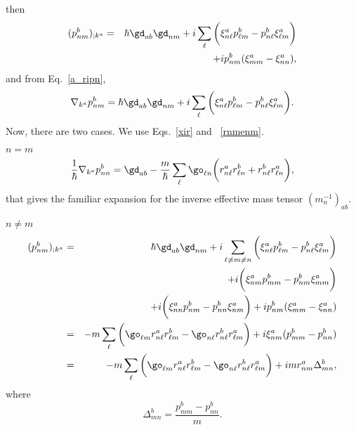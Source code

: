 then
\begin{eqnarray}\label{a_rapb2}
(p^b_{nm})_{;k^a}&=&
\hbar\gd_{ab}\gd_{nm}
+i
\sum_{\ell}
\bigg(
\xi^a_{n\ell}
p^b_{\ell m}
-
p^b_{n\ell}
\xi^a_{\ell m}
\bigg)
\nonumber \\
&&+i
p^b_{nm}(\xi^a_{mm}
-
\xi^a_{nn}
)
,
\end{eqnarray}
and from Eq.~\eqref{a_ripn},
\begin{eqnarray}\label{cogno}
\nabla_{k^a}p^b_{nm}=
\hbar\gd_{ab}\gd_{nm}
+i
\sum_{\ell}
\bigg(
\xi^a_{n\ell}
p^b_{\ell m}
-
p^b_{n\ell}
\xi^a_{\ell m}
\bigg)
.
\end{eqnarray}
Now, there are two cases. We use Eqs.~\eqref{xir} and ~\eqref{rnmenm}.

 $n=m$
\begin{eqnarray}\label{tita}
\frac{1}{\hbar}\nabla_{k^a}p^b_{nn}=
\gd_{ab}
-\frac{m}{\hbar}
\sum_{\ell}
\go_{\ell n}
\bigg(
r^a_{n\ell}
r^b_{\ell n}
+
r^b_{n\ell}
r^a_{\ell n}
\bigg)
,
\end{eqnarray}
that gives the familiar expansion for the inverse effective mass
tensor $(m_n^{-1})_{ab}$.\cite{aschcroft}

 $n\ne m$
\begin{eqnarray}\label{mes}
(p^b_{nm})_{;k^a}&=&
\hbar\gd_{ab}\gd_{nm}
+i
\sum_{\ell\ne m\ne n}
\bigg(
\xi^a_{n\ell}
p^b_{\ell m}
-
p^b_{n\ell}
\xi^a_{\ell m}
\bigg)
\nonumber\\
&&+
i
\bigg(
\xi^a_{nm}
p^b_{mm}
-
p^b_{nm}
\xi^a_{mm}
\bigg)
\nonumber\\
&&+
i
\bigg(
\xi^a_{nn}
p^b_{nm}
-
p^b_{nn}
\xi^a_{nm}
\bigg)
+i
p^b_{nm}(\xi^a_{mm}
-
\xi^a_{nn}
)
\nonumber \\
&=&
-m
\sum_{\ell}
\bigg(
\go_{\ell m}
r^a_{n\ell}
r^b_{\ell m}
-
\go_{n\ell}
r^b_{n\ell}
r^a_{\ell m}
\bigg)
+i
\xi^a_{nm}
(p^b_{mm}
-
p^b_{nn}
)
\nonumber \\
&=&
-m
\sum_{\ell}
\bigg(
\go_{\ell m}
r^a_{n\ell}
r^b_{\ell m}
-
\go_{n\ell}
r^b_{n\ell}
r^a_{\ell m}
\bigg)
+i
mr^a_{nm}
\Delta^b_{mn}
,
\end{eqnarray}
where
\begin{equation}\label{a_delta}
\Delta^b_{mn}=\frac{p^b_{mm}-p^b_{nn}}{m}
.
\end{equation}

